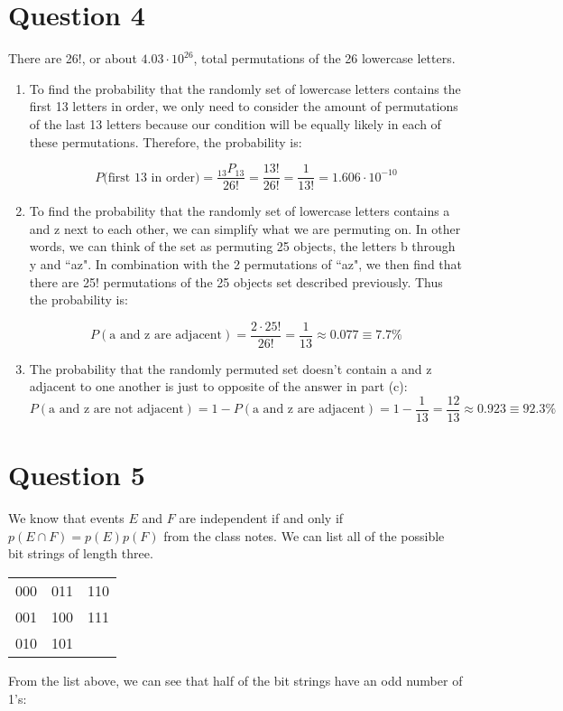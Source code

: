 \documentclass[11pt]{article}
\renewcommand{\arraystretch}{1.25}
\begin{document}
\section*{Question 4}
There are 26!, or about $4.03 \cdot 10^{26}$, total permutations of the 26 lowercase letters.

\begin{enumerate}
    \item To find the probability that the randomly set of lowercase letters contains the first 13 letters in order, we only need to consider the amount of permutations of the last 13 letters because our condition will be equally likely in each of these permutations. Therefore, the probability is:
    
    \[P(\text{first 13 in order)} = \frac{_{13}P_{13}}{26!} = \frac{13!}{26!} = \frac{1}{13!} = 1.606 \cdot 10^{-10}\]
    
    \item To find the probability that the randomly set of lowercase letters contains a and z next to each other, we can simplify what we are permuting on. In other words, we can think of the set as permuting 25 objects, the letters b through y and ``az". In combination with the 2 permutations of ``az", we then find that there are 25! permutations of the 25 objects set described previously. Thus the probability is:
    
    \[P(\text{a and z are adjacent}) = \frac{2 \cdot 25!}{26!} = \frac{1}{13} \approx 0.077 \equiv 7.7\%\]
    
    \item The probability that the randomly permuted set doesn't contain a and z adjacent to one another is just to opposite of the answer in part (c):
    \[P(\text{a and z are not adjacent}) = 1 - P(\text{a and z are adjacent}) = 1 - \frac{1}{13} = \frac{12}{13} \approx 0.923 \equiv 92.3\%\]
\end{enumerate}

\section*{Question 5}
We know that events $E$ and $F$ are independent if and only if $p(E \cap F) = p(E)p(F)$ from the class notes. We can list all of the possible bit strings of length three.

\setlength{\tabcolsep}{16pt}
\renewcommand{\arraystretch}{1.25}
\begin{table}[H]
    \begin{tabular}{c c c}
         000 & 011 & 110 \\
         001 & 100 & 111 \\
         010 & 101 &  \\
    \end{tabular}
\end{table}
From the list above, we can see that half of the bit strings have an odd number of 1's:
\end{document}
